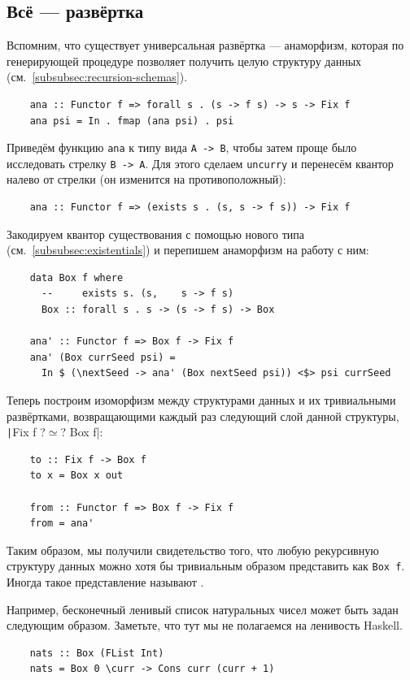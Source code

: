 \subsection{Всё --- развёртка} \label{subsec:all-unfolds}

Вспомним, что существует универсальная развёртка --- анаморфизм, которая по генерирующей процедуре позволяет получить целую структуру данных (см.~\ref{subsubsec:recursion-schemas}).
\begin{verbatim}
    ana :: Functor f => forall s . (s -> f s) -> s -> Fix f
    ana psi = In . fmap (ana psi) . psi
\end{verbatim}

Приведём функцию \texttt{ana} к типу вида \texttt{A -> B}, чтобы затем проще было исследовать стрелку \texttt{B -> A}.
Для этого сделаем \texttt{uncurry} и перенесём квантор налево от стрелки (он изменится на противоположный):
\begin{verbatim}
    ana :: Functor f => (exists s . (s, s -> f s)) -> Fix f
\end{verbatim}
Закодируем квантор существования с помощью нового типа (см.~\ref{subsubsec:existentials}) и перепишем анаморфизм на работу с ним:
\begin{verbatim}
    data Box f where
      --     exists s. (s,    s -> f s)
      Box :: forall s . s -> (s -> f s) -> Box

    ana' :: Functor f => Box f -> Fix f
    ana' (Box currSeed psi) =
      In $ (\nextSeed -> ana' (Box nextSeed psi)) <$> psi currSeed
\end{verbatim}
Теперь построим изоморфизм между структурами данных и их тривиальными развёртками, возвращающими каждый раз следующий слой данной структуры, \texttt|Fix f ?$\simeq$? Box f|:
\begin{verbatim}
    to :: Fix f -> Box f
    to x = Box x out

    from :: Functor f => Box f -> Fix f
    from = ana'
\end{verbatim}
Таким образом, мы получили свидетельство того, что любую рекурсивную структуру данных можно хотя бы тривиальным образом представить как \texttt{Box f}.
Иногда такое представление называют .

Например, бесконечный ленивый список натуральных чисел может быть задан следующим образом.
Заметьте, что тут мы не полагаемся на ленивость Haskell.
\begin{verbatim}
    nats :: Box (FList Int)
    nats = Box 0 \curr -> Cons curr (curr + 1)
\end{verbatim}

